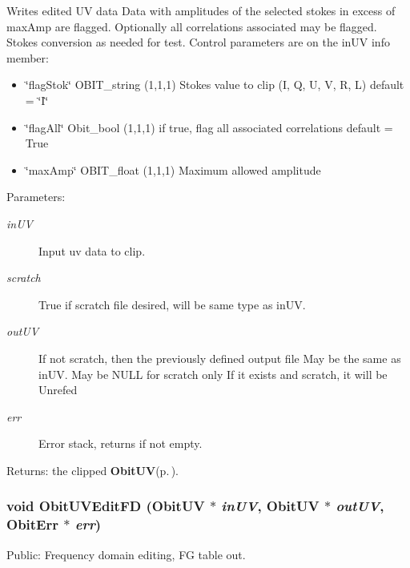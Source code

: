 Writes edited UV data Data with amplitudes of the selected stokes in excess of max\-Amp are flagged. Optionally all correlations associated may be flagged. Stokes conversion as needed for test. Control parameters are on the in\-UV info member: \begin{itemize}
\item \char`\"{}flag\-Stok\char`\"{} OBIT\_\-string (1,1,1) Stokes value to clip (I, Q, U, V, R, L) default = \char`\"{}I\char`\"{} \item \char`\"{}flag\-All\char`\"{} Obit\_\-bool (1,1,1) if true, flag all associated correlations default = True \item \char`\"{}max\-Amp\char`\"{} OBIT\_\-float (1,1,1) Maximum allowed amplitude\end{itemize}
\begin{Desc}
\item[Parameters:]
\begin{description}
\item[{\em in\-UV}]Input uv data to clip. \item[{\em scratch}]True if scratch file desired, will be same type as in\-UV. \item[{\em out\-UV}]If not scratch, then the previously defined output file May be the same as in\-UV. May be NULL for scratch only If it exists and scratch, it will be Unrefed \item[{\em err}]Error stack, returns if not empty. \end{description}
\end{Desc}
\begin{Desc}
\item[Returns:]the clipped {\bf Obit\-UV}{\rm (p.\,\pageref{structObitUV})}. \end{Desc}
\subsubsection{\setlength{\rightskip}{0pt plus 5cm}void Obit\-UVEdit\-FD ({\bf Obit\-UV} $\ast$ {\em in\-UV}, {\bf Obit\-UV} $\ast$ {\em out\-UV}, {\bf Obit\-Err} $\ast$ {\em err})}\label{ObitUVEdit_8c_a24}


Public: Frequency domain editing, FG table out. 

